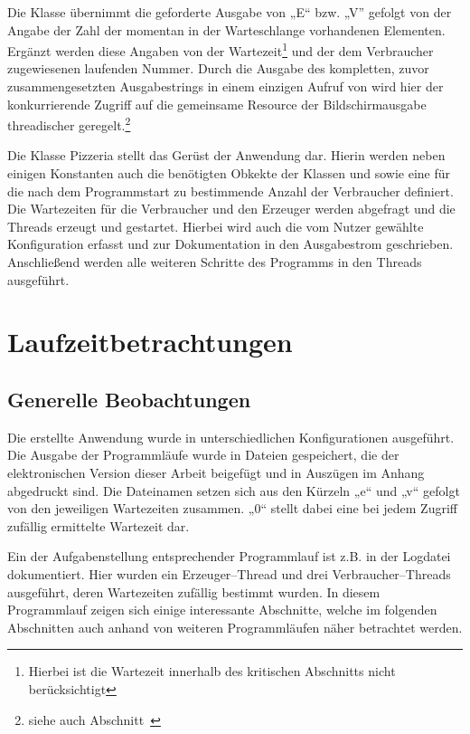 Die Klasse  übernimmt die geforderte Ausgabe von „E“ bzw. „V” gefolgt von der Angabe der Zahl der momentan in der Warteschlange vorhandenen Elementen. Ergänzt werden diese Angaben von der Wartezeit\footnote{Hierbei ist die Wartezeit innerhalb des kritischen Abschnitts nicht berücksichtigt} und der dem Verbraucher zugewiesenen laufenden Nummer. Durch die Ausgabe des kompletten, zuvor zusammengesetzten Ausgabestrings in einem einzigen Aufruf von  wird hier der konkurrierende Zugriff auf die gemeinsame Resource der Bildschirmausgabe threadischer geregelt.\footnote{siehe auch Abschnitt~}

Die Klasse Pizzeria stellt das Gerüst der Anwendung dar. Hierin werden neben einigen Konstanten auch die benötigten Obkekte der Klassen  und  sowie eine  für die nach dem Programmstart zu bestimmende Anzahl der Verbraucher definiert. Die Wartezeiten für die Verbraucher und den Erzeuger werden abgefragt und die Threads erzeugt und gestartet. Hierbei wird auch die vom Nutzer gewählte Konfiguration erfasst und zur Dokumentation in den Ausgabestrom geschrieben. Anschließend werden alle weiteren Schritte des Programms in den Threads ausgeführt. 

\section{Laufzeitbetrachtungen} %
\label{sec:laufzeitbetrachtungen}

\subsection{Generelle Beobachtungen} %
\label{sub:generelle_beobachtungen}
Die erstellte Anwendung wurde in unterschiedlichen Konfigurationen ausgeführt. Die Ausgabe der Programmläufe wurde in Dateien gespeichert, die der elektronischen Version dieser Arbeit beigefügt und in Auszügen im Anhang abgedruckt sind. Die Dateinamen setzen sich aus den Kürzeln „e“ und „v“ gefolgt von den jeweiligen Wartezeiten zusammen. „0“ stellt dabei eine bei jedem Zugriff zufällig ermittelte Wartezeit dar.

Ein der Aufgabenstellung entsprechender Programmlauf ist z.B. in der Logdatei  dokumentiert. Hier wurden ein Erzeuger–Thread und drei Verbraucher–Threads ausgeführt, deren Wartezeiten zufällig bestimmt wurden. In diesem Programmlauf zeigen sich einige interessante Abschnitte, welche im folgenden Abschnitten auch anhand von weiteren Programmläufen näher betrachtet werden.

